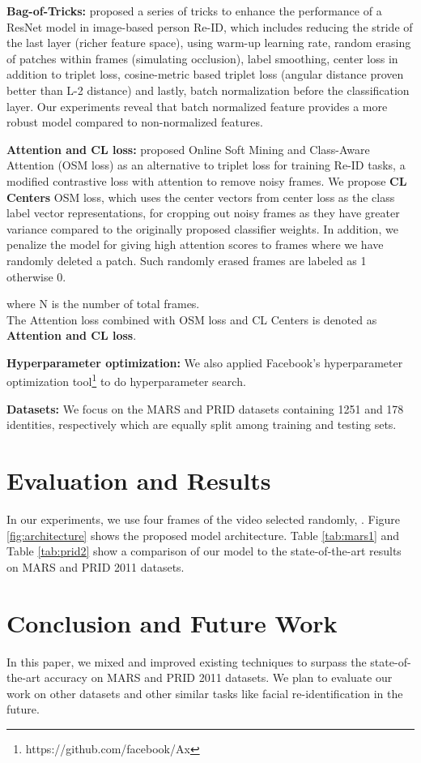 \documentclass[letterpaper]{article} \usepackage{aaai20}  \usepackage{times}  \usepackage{helvet} \usepackage{courier}  \usepackage[hyphens]{url}  \usepackage{graphicx} \urlstyle{rm} \def\UrlFont{\rm}  \usepackage{graphicx}  \frenchspacing  \setlength{\pdfpagewidth}{8.5in}  \setlength{\pdfpageheight}{11in}
\begin{document}
\noindent \textbf{Bag-of-Tricks:}
\citeauthor{bagoftricks}  proposed a series of tricks to enhance the performance of a ResNet model in image-based person Re-ID, which includes reducing the stride of the last layer (richer feature space), using warm-up learning rate, random erasing of patches within frames (simulating occlusion), label smoothing, center loss in addition to triplet loss, cosine-metric based triplet loss (angular distance proven better than L-2 distance) and lastly, batch normalization before the classification layer. Our experiments reveal that batch normalized feature provides a more robust model compared to non-normalized features.

\noindent \textbf{Attention and CL loss:}
\citeauthor{osm_caa}  proposed Online Soft Mining and Class-Aware Attention (OSM loss) as an alternative to triplet loss for training Re-ID tasks, a modified contrastive loss with attention to remove noisy frames. We propose \textbf{CL Centers} OSM loss, which uses the center vectors from center loss as the class label vector representations, for cropping out noisy frames as they have greater variance compared to the originally proposed classifier weights. In addition, we penalize the model for giving high attention scores to frames where we have randomly deleted a patch. Such randomly erased frames are labeled as 1 otherwise 0.

where N is the number of total frames. \\ The Attention loss combined with OSM loss and CL Centers is denoted as \textbf{Attention and CL loss}.

\noindent \textbf{Hyperparameter optimization:} We also applied Facebook's hyperparameter optimization tool\footnote{https://github.com/facebook/Ax} to do hyperparameter search.

\noindent \textbf{Datasets:} We focus on the MARS and PRID datasets containing 1251 and 178 identities, respectively which are equally split among training and testing sets.

\section{Evaluation and Results}
In our experiments, we use four frames of the video selected randomly, . Figure \ref{fig:architecture} shows the proposed model architecture. Table \ref{tab:mars1} and Table \ref{tab:prid2} show a comparison of our model to the state-of-the-art results on MARS and PRID 2011 datasets.


\section{Conclusion and Future Work}
In this paper, we mixed and improved existing techniques to surpass the state-of-the-art accuracy on MARS and PRID 2011 datasets. We plan to evaluate our work on other datasets and other similar tasks like facial re-identification in the future. 






\end{document}

